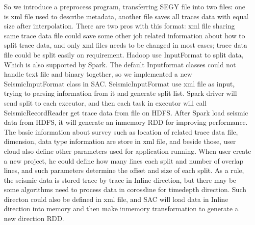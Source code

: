 So we introduce a preprocess program, transferring SEGY file into two files: one is xml file used to describe metadata, another file saves all traces data with equal size after interpolation. There are two pros with this format: xml file sharing same trace data file could save some other job related information about how to split trace data, and only xml files needs to be changed in most cases; trace data file could be split easily on requirement. Hadoop use InputFormat to split data, Which is also supported by Spark. The default Inputformat classes could not handle text file and binary together, so we implemented a new SeismicInputFormat class in SAC. SeismicInputFormat use xml file as input, trying to parsing information from it and generate split list. Spark driver will send split to each executor, and then each task in executor will call SeismicRecordReader get trace data from file on HDFS. After Spark load seismic data from HDFS, it will generate an in\-memory RDD \cite{SparkRDD} for improving performance. The basic information about survey such as location of related trace data file, dimension, data type information are store in xml file, and beside those, user cloud also define other parameters used for application running. When user create a new project, he could define how many lines each split and number of overlap lines, and such parameters determine the offset and size of each split. As a rule, the seismic data is stored trace by trace in Inline direction, but there may be some algorithms need to process data in coross\-line for time\-depth direction. Such directon could also be defined in xml file, and SAC will load data in Inline direction into memory and then make in\-memory transformation to generate a new direction RDD.
  

